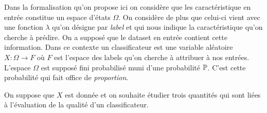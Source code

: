 \documentclass[11pt, a4paper]{article}
\begin{document}
Dans la formalisation qu'on propose ici on considère que les
caractéristique en entrée constitue un espace d'états $\Omega$. On
considère de plus que celui-ci vient avec une fonction $\lambda$ qu'on
désigne par \textit{label} et qui nous indique la caractéristique
qu'on cherche à prédire. On a supposé que le dataset en entrée
contient cette information. Dans ce contexte un classificateur est une
variable aléatoire $X : \Omega \to F$ où $F$ est l'espace des labels
qu'on cherche à attribuer à nos entrées. L'espace $\Omega$ est supposé
fini probabilisé muni d'une probabilité $\mathbb{P}$. C'est cette
probabilité qui fait office de \textit{proportion}.

On suppose que $X$ est donnée et on souhaite étudier trois quantités
qui sont liées à l'évaluation de la qualité d'un classificateur.
\end{document}
